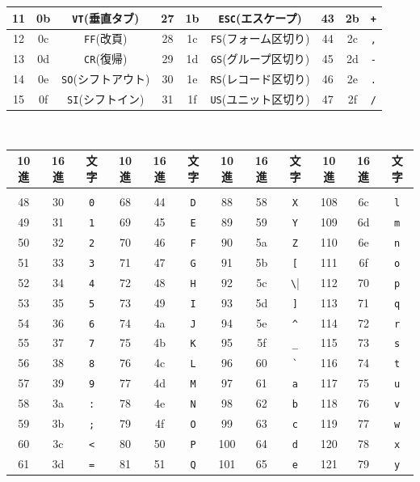 \begin{table}
\begin{tabular}{|c|c|c||c|c|c||c|c|c|}
11&0b&\verb|VT|{\scriptsize (垂直タブ)}&27&1b&\verb|ESC|{\scriptsize (エスケープ)}&43&2b&\verb|+|\\ \hline
12&0c&\verb|FF|{\scriptsize (改頁)}&28&1c&\verb|FS|{\scriptsize (フォーム区切り)}&44&2c&\verb|,|\\ \hline
13&0d&\verb|CR|{\scriptsize (復帰)}&29&1d&\verb|GS|{\scriptsize (グループ区切り)}&45&2d&\verb|-|\\ \hline
14&0e&\verb|SO|{\scriptsize (シフトアウト)}&30&1e&\verb|RS|{\scriptsize (レコード区切り)}&46&2e&\verb|.|\\ \hline
15&0f&\verb|SI|{\scriptsize (シフトイン)}&31&1f&\verb|US|{\scriptsize (ユニット区切り)}&47&2f&\verb|/|\\ \hline
\end{tabular}
　\newline
\centering
\begin{tabular}{|c|c|c||c|c|c||c|c|c||c|c|c|}\hline
10進&16進&文字&10進&16進&文字&10進&16進&文字&10進&16進&文字\\ \hline
& & & & & & & & & & & \\[-15pt] \hline
48&30&\verb|0|&68&44&\verb|D|&88&58&\verb|X|&108&6c&\verb|l|\\ \hline
49&31&\verb|1|&69&45&\verb|E|&89&59&\verb|Y|&109&6d&\verb|m|\\ \hline
50&32&\verb|2|&70&46&\verb|F|&90&5a&\verb|Z|&110&6e&\verb|n|\\ \hline
51&33&\verb|3|&71&47&\verb|G|&91&5b&\verb|[|&111&6f&\verb|o|\\ \hline
52&34&\verb|4|&72&48&\verb|H|&92&5c&\verb|\|&112&70&\verb|p|\\ \hline
53&35&\verb|5|&73&49&\verb|I|&93&5d&\verb|]|&113&71&\verb|q|\\ \hline
54&36&\verb|6|&74&4a&\verb|J|&94&5e&\verb|^|&114&72&\verb|r|\\ \hline
55&37&\verb|7|&75&4b&\verb|K|&95&5f&\verb|_|&115&73&\verb|s|\\ \hline
56&38&\verb|8|&76&4c&\verb|L|&96&60&\verb|`|&116&74&\verb|t|\\ \hline
57&39&\verb|9|&77&4d&\verb|M|&97&61&\verb|a|&117&75&\verb|u|\\ \hline
58&3a&\verb|:|&78&4e&\verb|N|&98&62&\verb|b|&118&76&\verb|v|\\ \hline
59&3b&\verb|;|&79&4f&\verb|O|&99&63&\verb|c|&119&77&\verb|w|\\ \hline
60&3c&\verb|<|&80&50&\verb|P|&100&64&\verb|d|&120&78&\verb|x|\\ \hline
61&3d&\verb|=|&81&51&\verb|Q|&101&65&\verb|e|&121&79&\verb|y|\\ \hline

\end{tabular}
\end{table}
